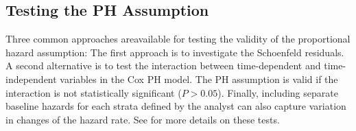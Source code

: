 \documentclass[12pt,letterpaper]{article}
\begin{document}

\subsection{Testing the PH Assumption}
Three common approaches areavailable for testing the validity of the proportional hazard assumption: The first approach is to investigate the Schoenfeld residuals. A second alternative is to test the interaction between time-dependent and time-independent variables in the Cox PH model. The PH assumption is valid if the interaction is not statistically significant ($P>0.05$). Finally, including separate baseline hazards for each strata defined by the analyst can also capture variation in changes of the hazard rate. See \citet{allison2010,collett2015} for more details on these tests.
\end{document}
